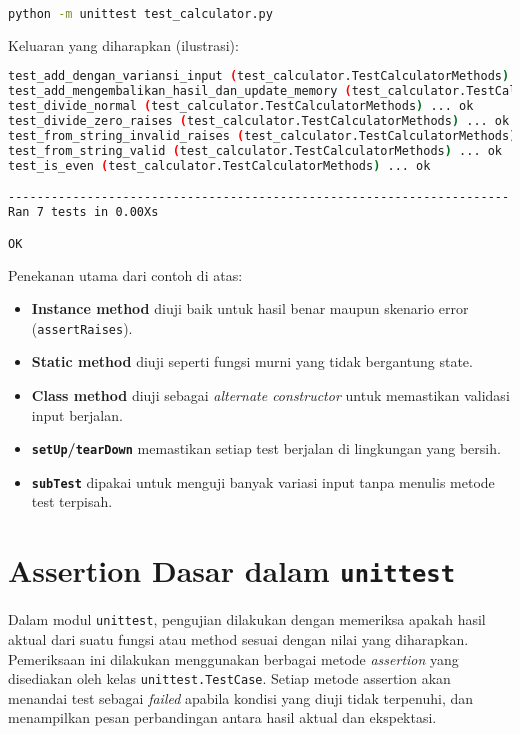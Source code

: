 \begin{lstlisting}[language=bash]
python -m unittest test_calculator.py
\end{lstlisting}

\noindent
Keluaran yang diharapkan (ilustrasi):

\begin{lstlisting}[language=bash]
test_add_dengan_variansi_input (test_calculator.TestCalculatorMethods) ... ok
test_add_mengembalikan_hasil_dan_update_memory (test_calculator.TestCalculatorMethods) ... ok
test_divide_normal (test_calculator.TestCalculatorMethods) ... ok
test_divide_zero_raises (test_calculator.TestCalculatorMethods) ... ok
test_from_string_invalid_raises (test_calculator.TestCalculatorMethods) ... ok
test_from_string_valid (test_calculator.TestCalculatorMethods) ... ok
test_is_even (test_calculator.TestCalculatorMethods) ... ok

----------------------------------------------------------------------
Ran 7 tests in 0.00Xs

OK
\end{lstlisting}

Penekanan utama dari contoh di atas:
\begin{itemize}
    \item \textbf{Instance method} diuji baik untuk hasil benar maupun skenario error (\texttt{assertRaises}).
    \item \textbf{Static method} diuji seperti fungsi murni yang tidak bergantung state.
    \item \textbf{Class method} diuji sebagai \emph{alternate constructor} untuk memastikan validasi input berjalan.
    \item \textbf{\texttt{setUp}/\texttt{tearDown}} memastikan setiap test berjalan di lingkungan yang bersih.
    \item \textbf{\texttt{subTest}} dipakai untuk menguji banyak variasi input tanpa menulis metode test terpisah.
\end{itemize}

\section{Assertion Dasar dalam \texttt{unittest}}

Dalam modul \texttt{unittest}, pengujian dilakukan dengan memeriksa apakah hasil aktual dari suatu fungsi atau method sesuai dengan nilai yang diharapkan.  
Pemeriksaan ini dilakukan menggunakan berbagai metode \textit{assertion} yang disediakan oleh kelas \texttt{unittest.TestCase}.  
Setiap metode assertion akan menandai test sebagai \textit{failed} apabila kondisi yang diuji tidak terpenuhi, dan menampilkan pesan perbandingan antara hasil aktual dan ekspektasi.

